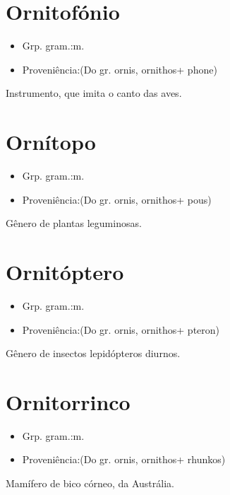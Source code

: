 \section{Ornitofónio}
\begin{itemize}
\item {Grp. gram.:m.}
\end{itemize}
\begin{itemize}
\item {Proveniência:(Do gr. \textunderscore ornis\textunderscore , \textunderscore ornithos\textunderscore  + \textunderscore phone\textunderscore )}
\end{itemize}
Instrumento, que imita o canto das aves.
\section{Ornítopo}
\begin{itemize}
\item {Grp. gram.:m.}
\end{itemize}
\begin{itemize}
\item {Proveniência:(Do gr. \textunderscore ornis\textunderscore , \textunderscore ornithos\textunderscore  + \textunderscore pous\textunderscore )}
\end{itemize}
Gênero de plantas leguminosas.
\section{Ornitóptero}
\begin{itemize}
\item {Grp. gram.:m.}
\end{itemize}
\begin{itemize}
\item {Proveniência:(Do gr. \textunderscore ornis\textunderscore , \textunderscore ornithos\textunderscore  + \textunderscore pteron\textunderscore )}
\end{itemize}
Gênero de insectos lepidópteros diurnos.
\section{Ornitorrinco}
\begin{itemize}
\item {Grp. gram.:m.}
\end{itemize}
\begin{itemize}
\item {Proveniência:(Do gr. \textunderscore ornis\textunderscore , \textunderscore ornithos\textunderscore  + \textunderscore rhunkos\textunderscore )}
\end{itemize}
Mamífero de bico córneo, da Austrália.
